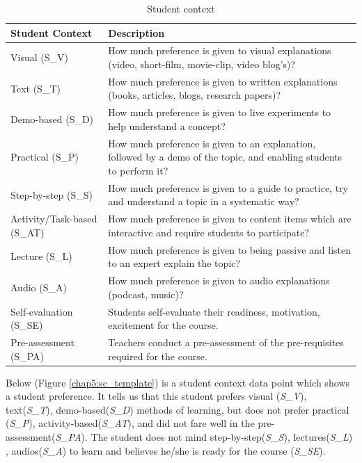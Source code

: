 \begin{table}[H]
    \centering
    \begin{tabular}{|p{3cm}|p{11.3cm}|} 
    \hline
    \textrm{\textbf{Student Context}} & \textrm{\textbf{Description}} \\ \hline
    \textrm{Visual (S\_V)} & \textrm{How much preference is given to visual explanations (video, short-film, movie-clip, video blog's)?}\\ \hline
    \textrm{Text (S\_T)} & \textrm{How much preference is given to written explanations (books, articles, blogs, research papers)?} \\ \hline
    \textrm{Demo-based (S\_D)} & \textrm{How much preference is given to live experiments to help understand a concept?} \\ \hline
    \textrm{Practical (S\_P)} & \textrm{How much preference is given to an explanation, followed by a demo of the topic, and enabling students to perform it?} \\ \hline
    \textrm{Step-by-step (S\_S)} & \textrm{How much preference is given to a guide to practice, try and understand a topic in a systematic way?} \\ \hline
    \textrm{Activity/Task-based (S\_AT)} & \textrm{How much preference is given to content items which are interactive and require students to participate?} \\ \hline
    \textrm{Lecture (S\_L)} & \textrm{How much preference is given to being passive and listen to an expert explain the topic?} \\ \hline
    \textrm{Audio (S\_A)} & \textrm{How much preference is given to audio explanations (podcast, music)?} \\ \hline
    \textrm{Self-evaluation (S\_SE)} & \textrm{Students self-evaluate their readiness, motivation, excitement for the course.} \\ \hline
    \textrm{Pre-assessment (S\_PA)} & \textrm{Teachers conduct a pre-assessment of the pre-requisites required for the course.} \\ \hline       
    \end{tabular}
    \caption{Student context}
    \label{chap5:student}
\end{table}

Below (Figure \ref{chap5:sc_template}) is a student context data point which shows a student preference. It tells us that this student prefers visual (\textit{S\_V}), text(\textit{S\_T}), demo-based(\textit{S\_D}) methods of learning, but does not prefer practical (\textit{S\_P}), activity-based(\textit{S\_AT}), and did not fare well in the pre-assessment(\textit{S\_PA}). The student does not mind step-by-step(\textit{S\_S}), lectures(\textit{S\_L}) , audios(\textit{S\_A}) to learn and believes he/she is ready for the course (\textit{S\_SE}). \par

